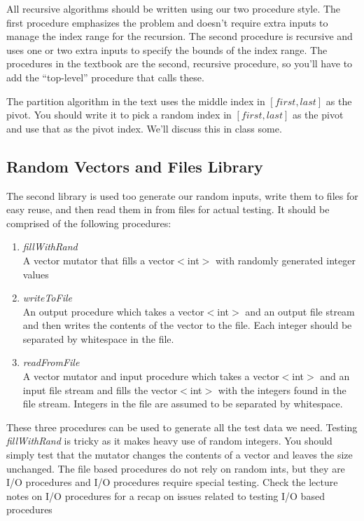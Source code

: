 \documentclass[]{tufte-handout}
\begin{document}
All recursive algorithms should be written using our two procedure style. The first procedure emphasizes the problem and doesn't require extra inputs to manage the index range for the recursion. The second procedure is recursive and uses one or two extra inputs to specify the bounds of the index range.  The procedures in the textbook are the second, recursive procedure, so you'll have to add the ``top-level'' procedure that calls these.

The partition algorithm in the text uses the middle index in $[first,last]$ as the pivot. You should write it to pick a random index in $[first,last]$ as the pivot and use that as the pivot index. We'll discuss this in class some.

\subsection{Random Vectors and Files Library}
The second library is used too generate our random inputs, write them to files for easy reuse, and then read them in from files for actual testing.  It should be comprised of the following procedures:
\begin{enumerate}
\item \textit{fillWithRand} \\
A vector mutator that fills a vector$<$int$>$ with randomly generated integer values
\item \textit{writeToFile} \\ 
An output procedure which takes a vector$<$int$>$ and an output file stream and then writes the contents of the vector to the file. Each integer should be separated by whitespace in the file.
\item \textit{readFromFile} \\
A vector mutator and input procedure which takes a vector$<$int$>$ and an input file stream and fills the vector$<$int$>$ with the integers found in the file stream. Integers in the file are assumed to be separated by whitespace.
\end{enumerate}
These three procedures can be used to generate all the test data we need. Testing \textit{fillWithRand} is tricky as it makes heavy use of random integers. You should simply test that the mutator changes the contents of a vector and leaves the size unchanged.  The file based procedures do not rely on random ints, but they are I/O procedures and I/O procedures require special testing. Check the lecture notes on I/O procedures for a recap on issues related to testing I/O based procedures
\end{document}
